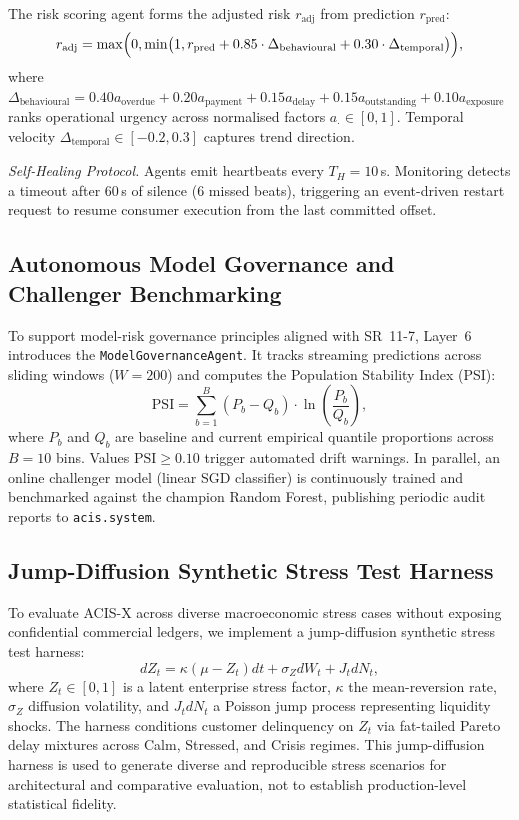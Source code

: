 \documentclass[runningheads]{llncs}
\begin{document}
The risk scoring agent forms the adjusted risk $r_{\text{adj}}$ from prediction $r_{\text{pred}}$:
\begin{equation}
r_{\text{adj}}=\max\Bigl(0,\min\bigl(1,r_{\text{pred}}+0.85\cdot\Delta_{\text{behavioural}}+0.30\cdot\Delta_{\text{temporal}}\bigr)\Bigr),
\label{eq:refinement}
\end{equation}
where $\Delta_{\text{behavioural}} = 0.40a_{\text{overdue}}+0.20a_{\text{payment}}+0.15a_{\text{delay}}+0.15a_{\text{outstanding}}+0.10a_{\text{exposure}}$ ranks operational urgency across normalised factors $a_{\cdot}\in[0,1]$. Temporal velocity $\Delta_{\text{temporal}}\in[-0.2,0.3]$ captures trend direction.

\noindent\textit{Self-Healing Protocol.} Agents emit heartbeats every $T_H=10$\,s. Monitoring detects a timeout after 60\,s of silence (6 missed beats), triggering an event-driven restart request to resume consumer execution from the last committed offset.

\subsection{Autonomous Model Governance and Challenger Benchmarking}

To support model-risk governance principles aligned with SR~11-7, Layer~6 introduces the \texttt{ModelGovernanceAgent}. It tracks streaming predictions across sliding windows ($W=200$) and computes the Population Stability Index (PSI):
\begin{equation}
\text{PSI} = \sum_{b=1}^{B} (P_b - Q_b) \cdot \ln\left(\frac{P_b}{Q_b}\right),
\label{eq:psi}
\end{equation}
where $P_b$ and $Q_b$ are baseline and current empirical quantile proportions across $B=10$ bins. Values $\text{PSI} \ge 0.10$ trigger automated drift warnings. In parallel, an online challenger model (linear SGD classifier) is continuously trained and benchmarked against the champion Random Forest, publishing periodic audit reports to \texttt{acis.system}.

\subsection{Jump-Diffusion Synthetic Stress Test Harness}

To evaluate ACIS-X across diverse macroeconomic stress cases without exposing confidential commercial ledgers, we implement a jump-diffusion synthetic stress test harness:
\begin{equation}
dZ_t = \kappa (\mu - Z_t) dt + \sigma_Z dW_t + J_t dN_t,
\label{eq:jumpdiff}
\end{equation}
where $Z_t \in [0,1]$ is a latent enterprise stress factor, $\kappa$ the mean-reversion rate, $\sigma_Z$ diffusion volatility, and $J_t dN_t$ a Poisson jump process representing liquidity shocks. The harness conditions customer delinquency on $Z_t$ via fat-tailed Pareto delay mixtures across Calm, Stressed, and Crisis regimes. This jump-diffusion harness is used to generate diverse and reproducible stress scenarios for architectural and comparative evaluation, not to establish production-level statistical fidelity.
\end{document}
